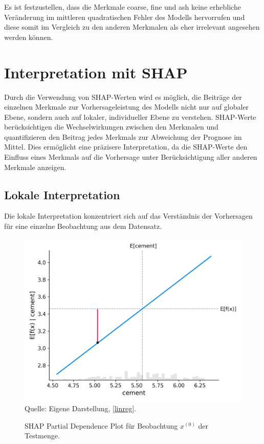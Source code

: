 Es ist festzustellen, dass die Merkmale coarse, fine und ash keine erhebliche Veränderung im mittleren quadratischen
Fehler des Modells hervorrufen und diese somit im Vergleich zu den anderen Merkmalen als eher irrelevant angesehen werden können.

\section{Interpretation mit SHAP}

Durch die Verwendung von SHAP-Werten wird 
es möglich, die Beiträge der einzelnen Merkmale zur Vorhersageleistung des Modells nicht nur 
auf globaler Ebene, sondern auch auf lokaler, individueller Ebene zu verstehen. 
SHAP-Werte berücksichtigen die Wechselwirkungen zwischen den Merkmalen und 
quantifizieren den Beitrag jedes Merkmals zur Abweichung der Prognose im Mittel. 
Dies ermöglicht eine präzisere Interpretation, da die SHAP-Werte den Einfluss 
eines Merkmals auf die Vorhersage unter Berücksichtigung aller anderen Merkmale anzeigen. 

\subsection{Lokale Interpretation}

Die lokale Interpretation konzentriert sich auf das Verständnis der Vorhersagen 
für eine einzelne Beobachtung aus dem Datensatz.

\begin{figure}[!h]
    \caption{SHAP Partial Dependence Plot für Beobachtung $x^{(0)}$ der Testmenge.}
    \includegraphics[width=1\textwidth]{../scripts/images/shap_dependence_plot.png}
    Quelle: Eigene Darstellung, \ref{linreg}.
    \label{pic:shap_dependence}
\end{figure}

